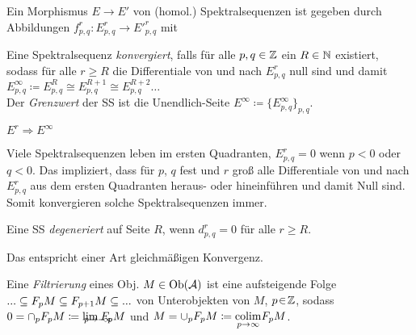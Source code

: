 \documentclass{cheat-sheet}
\begin{document}
\begin{defn}
  Ein Morphismus $E \to E'$ von (homol.) Spektralsequenzen ist gegeben durch Abbildungen $f^r_{p,q} : E^r_{p,q} \to E'^r_{p,q}$ mit
  \begin{itemize}
  \end{itemize}
\end{defn}

\begin{defn}
  Eine Spektralsequenz \emph{konvergiert}, falls für alle $p, q \in \mathbb{Z}$ ein $R \in \mathbb{N}$ existiert, sodass für alle $r \geq R$ die Differentiale von und nach $E^r_{p,q}$ null sind und damit $E^\infty_{p,q} \coloneqq E^R_{p,q} \cong E^{R+1}_{p,q} \cong E^{R+2}_{p,q} \ldots$ \\[2pt]
  Der \emph{Grenzwert} der SS ist die Unendlich-Seite $E^\infty \coloneqq \{ E^\infty_{p,q} \}_{p,q}$.
\end{defn}

\begin{nota}
  $E^r \Rightarrow E^\infty$
\end{nota}

\begin{bem}
  Viele Spektralsequenzen leben im ersten Quadranten, \dh{} $E^r_{p,q} = 0$ wenn $p < 0$ oder $q < 0$. Das impliziert, dass für $p$, $q$ fest und $r$ groß alle Differentiale von und nach $E^r_{p,q}$ aus dem ersten Quadranten heraus- oder hineinführen und damit Null sind. \\
  Somit konvergieren solche Spektralsequenzen immer.
\end{bem}

\begin{defn}
  Eine SS \emph{degeneriert} auf Seite $R$, wenn $d^r_{p,q} \!=\! 0$ für alle $r \!\geq\! R$.
\end{defn}

\begin{bem}
  Das entspricht einer Art gleichmäßigen Konvergenz.
\end{bem}

\begin{defn}
  Eine \emph{Filtrierung} eines Obj. $M \in \operatorname{Ob}(\mathcal{A})$ ist eine aufsteigende Folge $... \subseteq F_p M \subseteq F_{p+1} M \subseteq ...$ von Unterobjekten von $M$, $p \!\in\! \mathbb{Z}$, sodass $0 = \cap_p F_p M \coloneqq \lim_{\mathclap{p \to -\!\infty}} F_p M$ und $M = \cup_p F_p M \coloneqq \underset{\mathclap{p \to \infty}}{\colim} F_p M$.
\end{defn}
\end{document}
